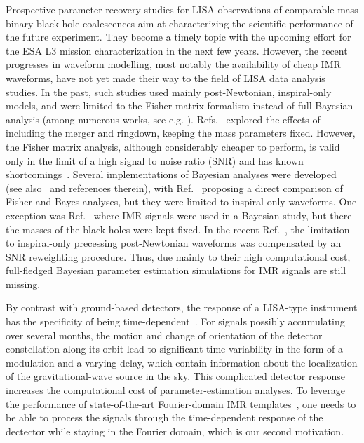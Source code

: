 \documentclass[aps,showpacs,twocolumn,
prd,superscriptaddress,nofootinbib]{revtex4-1}
\begin{document}
Prospective parameter recovery studies for LISA observations of comparable-mass binary black hole coalescences aim at characterizing the scientific performance of the future experiment. They become a timely topic with the upcoming effort for the ESA L3 mission characterization in the next few years. However, the recent progresses in waveform modelling, most notably the availability of cheap IMR waveforms, have not yet made their way to the field of LISA data analysis studies. In the past, such studies used mainly post-Newtonian, inspiral-only models, and were limited to the Fisher-matrix formalism instead of full Bayesian analysis (among numerous works, see e.g. \cite{Cutler97,LISAPE09}). Refs.~\cite{McWilliams+09,McWilliams+10,McWilliams+11} explored the effects of including the merger and ringdown, keeping the mass parameters fixed. However, the Fisher matrix analysis, although considerably cheaper to perform, is valid only in the limit of a high signal to noise ratio (SNR) and has known shortcomings~\cite{Vallisneri08}. Several implementations of Bayesian analyses were developed~\cite{CP06,Wickham+06,Babak+08,GP09,Feroz+09,Petiteau+10,PC13} (see also~\cite{MLDC4} and references therein), with Ref.~\cite{PC15} proposing a direct comparison of Fisher and Bayes analyses, but they were limited to inspiral-only waveforms. One exception was Ref.~\cite{Babak+08} where IMR signals were used in a Bayesian study, but there the masses of the black holes were kept fixed. In the recent Ref.~\cite{Klein+15}, the limitation to inspiral-only precessing post-Newtonian waveforms was compensated by an SNR reweighting procedure. Thus, due mainly to their high computational cost, full-fledged Bayesian parameter estimation simulations for IMR signals are still missing.

By contrast with ground-based detectors, the response of a LISA-type instrument has the specificity of being time-dependent~\cite{Cutler97}. For signals possibly accumulating over several months, the motion and change of orientation of the detector constellation along its orbit lead to significant time variability in the form of a modulation and a varying delay, which contain information about the localization of the gravitational-wave source in the sky. This complicated detector response increases the computational cost of parameter-estimation analyses. To leverage the performance of state-of-the-art Fourier-domain IMR templates~\cite{BTB16,Khan+15}, one needs to be able to process the signals through the time-dependent response of the dectector while staying in the Fourier domain, which is our second motivation.
\end{document}
